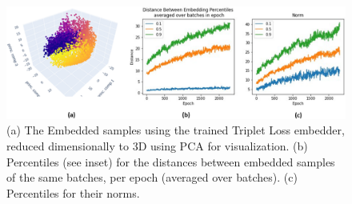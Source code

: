 \documentclass[11pt, a4paper, twoside]{article} %
\begin{document}
\begin{figure}[h!] 
     \centering 
    \includegraphics[width=0.8\linewidth]{triplet.PNG}
    \caption{ (a) The Embedded samples using the trained Triplet Loss embedder, reduced dimensionally to 3D using PCA for visualization. (b) Percentiles (see inset) for the distances between embedded samples of the same batches, per epoch (averaged over batches). (c) Percentiles for their norms. }
    \label{fig:triplet}
\end{figure}\vspace{-0.4cm}
\end{document}
